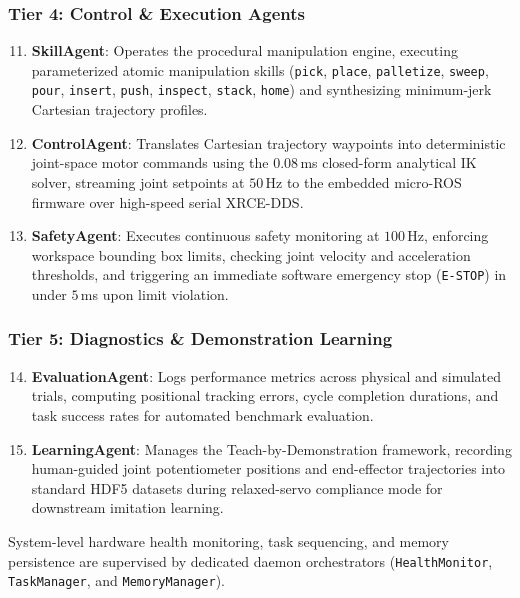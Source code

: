 \documentclass[journal]{IEEEtran}
\begin{document}
\subsubsection{Tier 4: Control \& Execution Agents}
\begin{enumerate}
    \setcounter{enumi}{10}
    \item \textbf{SkillAgent}: Operates the procedural manipulation engine, executing parameterized atomic manipulation skills (\texttt{pick}, \texttt{place}, \texttt{palletize}, \texttt{sweep}, \texttt{pour}, \texttt{insert}, \texttt{push}, \texttt{inspect}, \texttt{stack}, \texttt{home}) and synthesizing minimum-jerk Cartesian trajectory profiles.
    \item \textbf{ControlAgent}: Translates Cartesian trajectory waypoints into deterministic joint-space motor commands using the $0.08$\,ms closed-form analytical IK solver, streaming joint setpoints at $50$\,Hz to the embedded micro-ROS firmware over high-speed serial XRCE-DDS.
    \item \textbf{SafetyAgent}: Executes continuous safety monitoring at $100$\,Hz, enforcing workspace bounding box limits, checking joint velocity and acceleration thresholds, and triggering an immediate software emergency stop (\texttt{E-STOP}) in under $5$\,ms upon limit violation.
\end{enumerate}

\subsubsection{Tier 5: Diagnostics \& Demonstration Learning}
\begin{enumerate}
    \setcounter{enumi}{13}
    \item \textbf{EvaluationAgent}: Logs performance metrics across physical and simulated trials, computing positional tracking errors, cycle completion durations, and task success rates for automated benchmark evaluation.
    \item \textbf{LearningAgent}: Manages the Teach-by-Demonstration framework, recording human-guided joint potentiometer positions and end-effector trajectories into standard HDF5 datasets during relaxed-servo compliance mode for downstream imitation learning.
\end{enumerate}
System-level hardware health monitoring, task sequencing, and memory persistence are supervised by dedicated daemon orchestrators (\texttt{HealthMonitor}, \texttt{TaskManager}, and \texttt{MemoryManager}).
\end{document}
